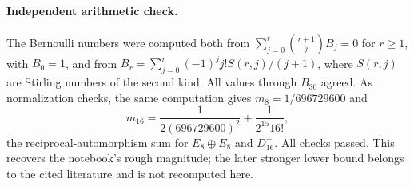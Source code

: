 \paragraph{Independent arithmetic check.}
The Bernoulli numbers were computed both from
\(\sum_{j=0}^{r}\binom{r+1}{j}B_j=0\) for \(r\geq1\), with \(B_0=1\),
and from
\(B_r=\sum_{j=0}^{r}(-1)^j j!S(r,j)/(j+1)\), where \(S(r,j)\) are Stirling
numbers of the second kind.  All values through \(B_{30}\) agreed.
As normalization checks, the same computation gives
\(m_8=1/696729600\) and
\[
m_{16}=\frac{1}{2(696729600)^2}+\frac{1}{2^{15}16!},
\]
the reciprocal-automorphism sum for \(E_8\oplus E_8\) and \(D_{16}^{+}\).
All checks passed.  This recovers the notebook's rough magnitude; the later
stronger lower bound belongs to the cited literature and is not recomputed
here.
